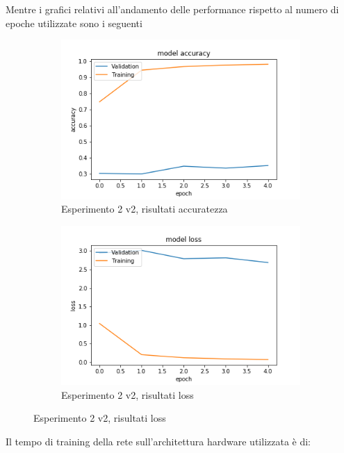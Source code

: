 Mentre i grafici relativi all'andamento delle performance rispetto al numero di epoche utilizzate sono i seguenti
\begin{figure}[H]
    \begin{subfigure}[b]{0.5\textwidth}
        \includegraphics[width=\textwidth]{./plots/exp2_p2_acc.png}
        \caption{Esperimento 2 v2, risultati accuratezza} 
        \label{fig:plot_exp2_p2_acc}
    \end{subfigure}
    \begin{subfigure}[b]{0.5\textwidth}
        \includegraphics[width=\textwidth]{./plots/exp2_p2_loss.png}
        \caption{Esperimento 2 v2, risultati loss} 
        \label{fig:plot_exp2_p2_loss}
	\end{subfigure}
\end{figure}
Il tempo di training della rete sull'architettura hardware utilizzata è di:


